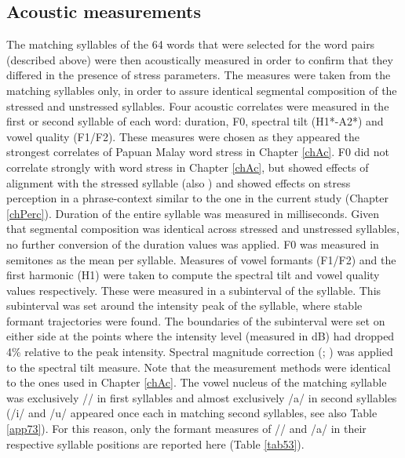 \subsection{Acoustic measurements}
The matching syllables of the 64 words that were selected for the word pairs (described above) were then acoustically measured in order to confirm that they differed in the presence of stress parameters. The measures were taken from the matching syllables only, in order to assure identical segmental composition of the stressed and unstressed syllables. Four acoustic correlates were measured in the first or second syllable of each word: duration, F0, spectral tilt (H1*-A2*) and vowel quality (F1/F2). These measures were chosen as they appeared the strongest correlates of Papuan Malay word stress in Chapter \ref{chAc}. F0 did not correlate strongly with word stress in Chapter \ref{chAc}, but showed effects of alignment with the stressed syllable (also \citealt{kaland_demarcating_2020}) and showed effects on stress perception in a phrase-context similar to the one in the current study (Chapter \ref{chPerc}). Duration of the entire syllable was measured in milliseconds. Given that segmental composition was identical across stressed and unstressed syllables, no further conversion of the duration values was applied. F0 was measured in semitones as the mean per syllable. Measures of vowel formants (F1/F2) and the first harmonic (H1) were taken to compute the spectral tilt and vowel quality values respectively. These were measured in a subinterval of the syllable. This subinterval was set around the intensity peak of the syllable, where stable formant trajectories were found. The boundaries of the subinterval were set on either side at the points where the intensity level (measured in dB) had dropped 4\% relative to the peak intensity. Spectral magnitude correction (\citealt[113--115]{hanson_glottal_1997}; \citealt{iseli_age_2007}) was applied to the spectral tilt measure. Note that the measurement methods were identical to the ones used in Chapter \ref{chAc}. The vowel nucleus of the matching syllable was exclusively // in first syllables and almost exclusively /a/ in second syllables (/i/ and /u/ appeared once each in matching second syllables, see also Table \ref{app73}). For this reason, only the formant measures of // and /a/ in their respective syllable positions are reported here (Table \ref{tab53}).

